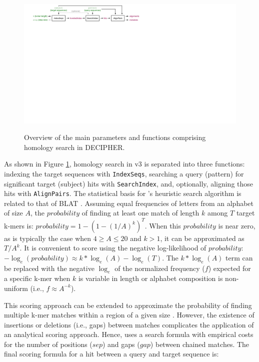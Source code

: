 \begin{figure}
\includegraphics[width=1\linewidth,alt={}]{figures/Fig1} \caption{Overview of the main parameters and functions comprising homology search in DECIPHER.}\label{fig:fig1}
\end{figure}

As shown in Figure \ref{fig:fig1}, homology search in  v3 is separated into three functions: indexing the target sequences with \texttt{IndexSeqs}, searching a query (pattern) for significant target (subject) hits with \texttt{SearchIndex}, and, optionally, aligning those hits with \texttt{AlignPairs}. The statistical basis for 's heuristic search algorithm is related to that of BLAT \citep{RN939}. Assuming equal frequencies of letters from an alphabet of size \(A\), the \(probability\) of finding at least one match of length \(k\) among \(T\) target k-mers is: \(probability = 1-(1-(1/A)^k)^T\). When this \(probability\) is near zero, as is typically the case when \(4 \ge A \le 20\) and \(k > 1\), it can be approximated as \(T/A^k\). It is convenient to score using the negative log-likelihood of \(probability\): \(-\log_e(probability) \approx k*\log_e(A) - \log_e(T)\). The \(k*\log_e(A)\) term can be replaced with the negative \(\log_e\) of the normalized frequency (\(f\)) expected for a specific k-mer when \(k\) is variable in length or alphabet composition is non-uniform (i.e., \(f \approx A^{-k}\)).

This scoring approach can be extended to approximate the probability of finding multiple k-mer matches within a region of a given size \citep{RN939}. However, the existence of insertions or deletions (i.e., gaps) between matches complicates the application of an analytical scoring approach. Hence,  uses a search formula with empirical costs for the number of positions (\(sep\)) and gaps (\(gap\)) between chained matches. The final scoring formula for a hit between a query and target sequence is:

